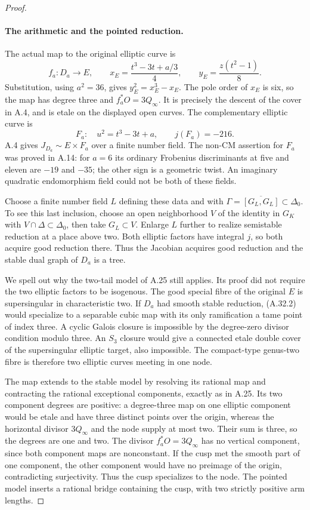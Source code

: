 \begin{proof}
\paragraph{The arithmetic and the pointed reduction.}
The actual map to the original elliptic curve is
\[
 f_a:D_a\longrightarrow E,\qquad
 x_E=\frac{t^3-3t+a/3}{4},\qquad
 y_E=\frac{z(t^2-1)}8.                                  \tag{A.32.2}
\]
Substitution, using \(a^2=36\), gives \(y_E^2=x_E^3-x_E\).
The pole order of \(x_E\) is six, so the map has degree
three and \(f_a^*O=3Q_\infty\). It is precisely the
descent of the cover in A.4, and is etale on the displayed
open curves. The complementary elliptic curve is
\[
                  F_a:\quad u^2=t^3-3t+a,
                  \qquad j(F_a)=-216.
\]
A.4 gives \(J_{D_a}\sim E\times F_a\) over a finite
number field. The non-CM assertion for \(F_a\) was proved
in A.14: for \(a=6\) its ordinary Frobenius discriminants
at five and eleven are \(-19\) and \(-35\); the other
sign is a geometric twist. An imaginary quadratic
endomorphism field could not be both of these fields.

Choose a finite number field \(L\) defining these data
and with \(\Gamma=\overline{[G_L,G_L]}\subset\Delta_0\).
To see this last inclusion, choose an open neighborhood
\(V\) of the identity in \(G_K\) with
\(V\cap\Delta\subset\Delta_0\), then take \(G_L\subset V\).
Enlarge \(L\) further to realize semistable reduction at a
place above two. Both elliptic factors have integral
\(j\), so both acquire good reduction there. Thus the
Jacobian acquires good reduction and the stable dual
graph of \(D_a\) is a tree.

We spell out why the two-tail model of A.25 still applies.
Its proof did not require the two elliptic factors to be
isogenous. The good special fibre of the original \(E\)
is supersingular in characteristic two. If \(D_a\) had
smooth stable reduction, (A.32.2) would specialize to a
separable cubic map with its only ramification a tame
point of index three. A cyclic Galois closure is
impossible by the degree-zero divisor condition modulo
three. An \(S_3\) closure would give a connected etale
double cover of the supersingular elliptic target,
also impossible. The compact-type genus-two fibre is
therefore two elliptic curves meeting in one node.

The map extends to the stable model by resolving its
rational map and contracting the rational exceptional
components, exactly as in A.25. Its two component degrees
are positive: a degree-three map on one elliptic component
would be etale and have three distinct points over the
origin, whereas the horizontal divisor \(3Q_\infty\)
and the node supply at most two. Their sum is three,
so the degrees are one and two. The divisor
\(f_a^*O=3Q_\infty\) has no vertical component, since
both component maps are nonconstant. If the cusp met
the smooth part of one component, the other component
would have no preimage of the origin, contradicting
surjectivity. Thus the cusp specializes to the node.
The pointed model inserts a rational bridge containing
the cusp, with two strictly positive arm lengths.


\end{proof}
